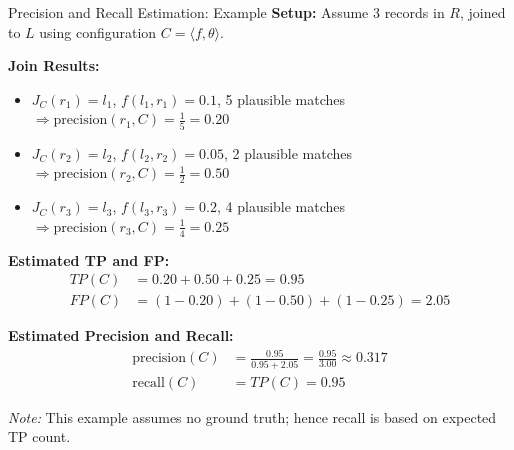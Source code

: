 \documentclass[8pt]{beamer} %
\begin{document}
	
\begin{frame}{Precision and Recall Estimation: Example}
	\textbf{Setup:} Assume 3 records in $R$, joined to $L$ using configuration $C = \langle f, \theta \rangle$.
	
	\textbf{Join Results:}
	\begin{itemize}
		\item $J_C(r_1) = l_1$, $f(l_1, r_1) = 0.1$, 5 plausible matches $\Rightarrow \text{precision}(r_1, C) = \frac{1}{5} = 0.20$
		\item $J_C(r_2) = l_2$, $f(l_2, r_2) = 0.05$, 2 plausible matches $\Rightarrow \text{precision}(r_2, C) = \frac{1}{2} = 0.50$
		\item $J_C(r_3) = l_3$, $f(l_3, r_3) = 0.2$, 4 plausible matches $\Rightarrow \text{precision}(r_3, C) = \frac{1}{4} = 0.25$
	\end{itemize}
	
	\textbf{Estimated TP and FP:}
	\begin{align*}
		TP(C) &= 0.20 + 0.50 + 0.25 = 0.95 \\
		FP(C) &= (1 - 0.20) + (1 - 0.50) + (1 - 0.25) = 2.05
	\end{align*}

	\textbf{Estimated Precision and Recall:}
	\begin{align*}
		\text{precision}(C) &= \frac{0.95}{0.95 + 2.05} = \frac{0.95}{3.00} \approx 0.317 \\
		\text{recall}(C) &= TP(C) = 0.95
	\end{align*}
	
	\textit{Note:} This example assumes no ground truth; hence recall is based on expected TP count.
\end{frame}
\end{document}
